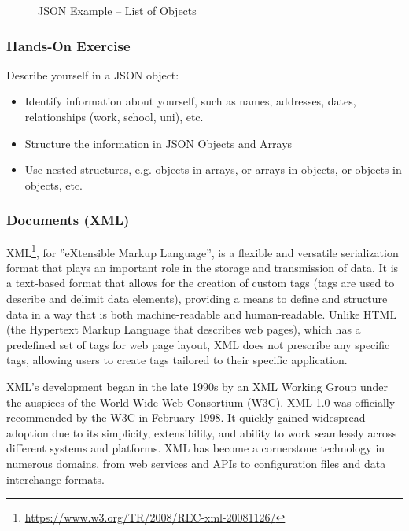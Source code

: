 \begin{figure}
\begin{jsoncode}
\end{jsoncode}
\caption{JSON Example -- List of Objects}
\label{fig:jason2}
\end{figure}

\begin{tcolorbox}[colback=code]
\subsubsection*{Hands-On Exercise} 

Describe yourself in a JSON object:
\begin{itemize}
	\item Identify information about yourself, such as names, addresses, dates, relationships (work, school, uni), etc.
	\item Structure the information in JSON Objects and Arrays 
	\item Use nested structures, e.g. objects in arrays, or arrays in objects, or objects in objects, etc.
\end{itemize}
\end{tcolorbox}

\subsubsection*{Documents (XML)}

XML\footnote{\url{https://www.w3.org/TR/2008/REC-xml-20081126/}}, for ''eXtensible Markup Language'', is a flexible and versatile serialization format that plays an important role in the storage and transmission of data. It is a text-based format that allows for the creation of custom tags (tags are used to describe and delimit data elements), providing a means to define and structure data in a way that is both machine-readable and human-readable. Unlike HTML (the Hypertext Markup Language that describes web pages), which has a predefined set of tags for web page layout, XML does not prescribe any specific tags, allowing users to create tags tailored to their specific application.

XML's development began in the late 1990s by an XML Working Group under the auspices of the World Wide Web Consortium (W3C). XML 1.0 was officially recommended by the W3C in February 1998. It quickly gained widespread adoption due to its simplicity, extensibility, and ability to work seamlessly across different systems and platforms. XML has become a cornerstone technology in numerous domains, from web services and APIs to configuration files and data interchange formats.

